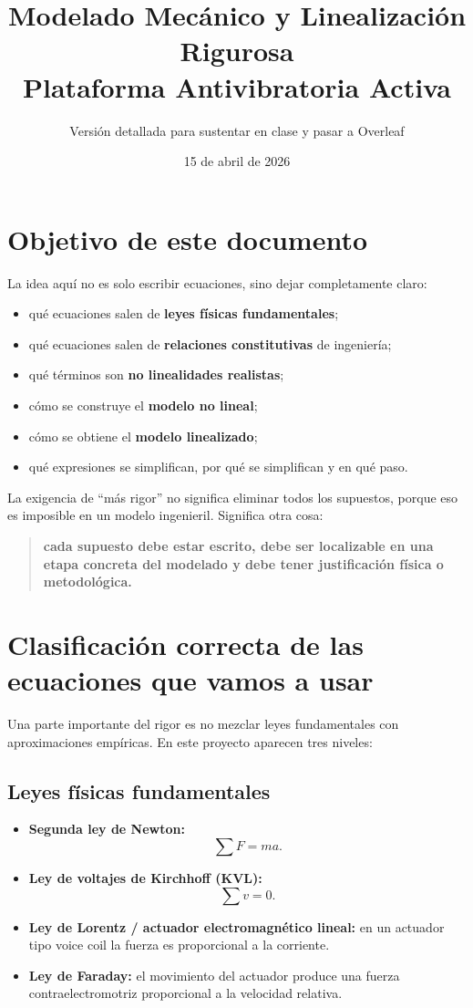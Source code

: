 \documentclass[11pt]{article}
\title{Modelado Mec\'anico y Linealizaci\'on Rigurosa\\Plataforma Antivibratoria Activa}
\author{Versi\'on detallada para sustentar en clase y pasar a Overleaf}
\date{15 de abril de 2026}
\begin{document}
\maketitle
\tableofcontents
\newpage

\section{Objetivo de este documento}

La idea aqu\'i no es solo escribir ecuaciones, sino dejar completamente claro:

\begin{itemize}[leftmargin=1.2cm]
\item qu\'e ecuaciones salen de \textbf{leyes f\'isicas fundamentales};
\item qu\'e ecuaciones salen de \textbf{relaciones constitutivas} de ingenier\'ia;
\item qu\'e t\'erminos son \textbf{no linealidades realistas};
\item c\'omo se construye el \textbf{modelo no lineal};
\item c\'omo se obtiene el \textbf{modelo linealizado};
\item qu\'e expresiones se simplifican, por qu\'e se simplifican y en qu\'e paso.
\end{itemize}

La exigencia de ``m\'as rigor'' no significa eliminar todos los supuestos, porque eso es imposible en un modelo ingenieril. Significa otra cosa:

\begin{quote}
\textbf{cada supuesto debe estar escrito, debe ser localizable en una etapa concreta del modelado y debe tener justificaci\'on f\'isica o metodol\'ogica.}
\end{quote}

\section{Clasificaci\'on correcta de las ecuaciones que vamos a usar}

Una parte importante del rigor es no mezclar leyes fundamentales con aproximaciones emp\'iricas. En este proyecto aparecen tres niveles:

\subsection{Leyes f\'isicas fundamentales}

\begin{itemize}[leftmargin=1.2cm]
\item \textbf{Segunda ley de Newton:}
\[
\sum F = m a.
\]
\item \textbf{Ley de voltajes de Kirchhoff (KVL):}
\[
\sum v = 0.
\]
\item \textbf{Ley de Lorentz / actuador electromagn\'etico lineal:} en un actuador tipo voice coil la fuerza es proporcional a la corriente.
\item \textbf{Ley de Faraday:} el movimiento del actuador produce una fuerza contraelectromotriz proporcional a la velocidad relativa.
\end{itemize}
\end{document}
